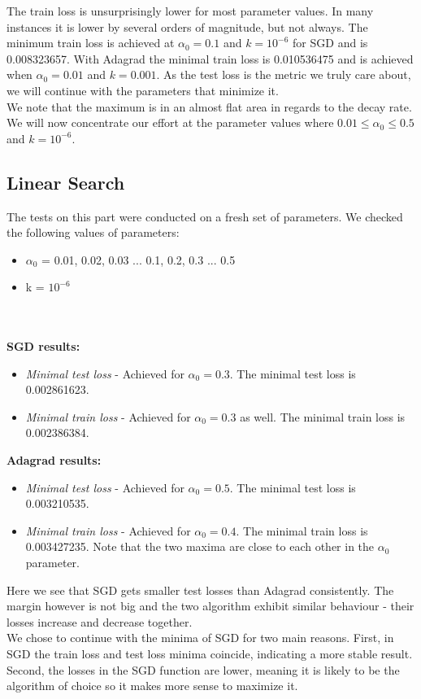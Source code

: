 \documentclass[12pt]{scrartcl}
\begin{document}
The train loss is unsurprisingly lower for most parameter values. In many instances it is lower by several orders of magnitude, but not always. The minimum train loss is achieved at $\alpha_0=0.1$ and $k=10^{-6}$ for SGD and is 0.008323657. With Adagrad the minimal train loss is 0.010536475 and is achieved when $\alpha_0 = 0.01$ and $k=0.001$. As the test loss is the metric we truly care about, we will continue with the parameters that minimize it.\\

We note that the maximum is in an almost flat area in regards to the decay rate. We will now concentrate our effort at the parameter values where $0.01 \leq \alpha_0 \leq 0.5$ and $k = 10^{-6}$.

\subsection{Linear Search}
The tests on this part were conducted on a fresh set of parameters. We checked the following values of parameters:
\begin{itemize}
\item $\alpha_0$ = 0.01, 0.02, 0.03 ... 0.1, 0.2, 0.3 ... 0.5
\item k = $10^{-6}$
\end{itemize}


\\\\

\textbf{SGD results:}
\begin{itemize}
\item \textit{Minimal test loss} - Achieved for $\alpha_0 = 0.3$. The minimal test loss is 0.002861623.
\item \textit{Minimal train loss} - Achieved for $\alpha_0 = 0.3$ as well. The minimal train loss is 0.002386384.
\end{itemize}

\textbf{Adagrad results:}
\begin{itemize}
\item \textit{Minimal test loss} - Achieved for $\alpha_0 = 0.5$. The minimal test loss is 0.003210535.
\item \textit{Minimal train loss} - Achieved for $\alpha_0 = 0.4$. The minimal train loss is 0.003427235. Note that the two maxima are close to each other in the $\alpha_0$ parameter.
\end{itemize}
Here we see that SGD gets smaller test losses than Adagrad consistently. The margin however is not big and the two algorithm exhibit similar behaviour - their losses increase and decrease together.\\
We chose to continue with the minima of SGD for two main reasons. First, in SGD the train loss and test loss minima coincide, indicating a more stable result. Second, the losses in the SGD function are lower, meaning it is likely to be the algorithm of choice so it makes more sense to maximize it.
\end{document}
